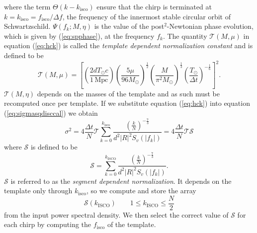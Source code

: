 where the term $\Theta\left(k-k_\mathrm{isco}\right)$ ensure that the chirp is
terminated at $k = k_\mathrm{isco} = f_\mathrm{isco} / \Delta f$, the
frequency of the innermost stable circular orbit of Schwartzschild.
$\Psi(f_k;M,\eta)$ is the value of the post$^2$-Newtonian phase evolution,
which is given by (\ref{eq:spphase}), at the frequency $f_k$. The quantity
$\mathcal{T}(M,\mu)$ in equation (\ref{eq:hck}) is called the \emph{template
dependent normalization constant} and is defined to be 
\begin{equation}
\mathcal{T}(M,\mu) = \left[
\left(\frac{2dT_\odot c}{1\,\mathrm{Mpc}}\right)
\left(\frac{5\mu}{96M_\odot}\right)^\frac{1}{2}
\left(\frac{M}{\pi^2M_\odot}\right)^\frac{1}{3}
\left(\frac{T_\odot}{\Delta t}\right)^{-\frac{1}{6}}
\right]^2.
\end{equation}
$\mathcal{T}(M,\eta)$ depends on the masses of the template and as such must
be recomputed once per template. If we substitute equation (\ref{eq:hck}) 
into equation (\ref{eq:sigmasqdisccal}) we obtain
\begin{equation}
\sigma^2 = 4 \frac{\Delta t}{N} \mathcal{T} 
\sum_{k=0}^{k_\mathrm{isco}} 
\frac{\left(\frac{k}{N}\right)^{-\frac{7}{3}}}
{d^2|R|^2S_v\left(\left|f_k\right|\right)}
= 4 \frac{\Delta t}{N} \mathcal{T} \mathcal{S}
\end{equation}
where $\mathcal{S}$ is defined to be
\begin{equation}
\mathcal{S} = 
\sum_{k=0}^{k_\mathrm{ISCO}} 
\frac{\left(\frac{k}{N}\right)^{-\frac{7}{3}}}{d^2|R|^2S_v\left(\left|f_k\right|\right)}.
\end{equation}
$\mathcal{S}$ is referred to as the \emph{segment dependent normalization}.
It depends on the template only through $k_\mathrm{isco}$, so we compute and
store the array 
\begin{equation}
\mathcal{S}(k_\mathrm{ISCO}) \quad \quad 1 \le k_\mathrm{ISCO} \le \frac{N}{2}
\end{equation}
from the input power spectral density. We then select the correct value of
$\mathcal{S}$ for each chirp by computing the $f_\mathrm{isco}$ of the
template.

